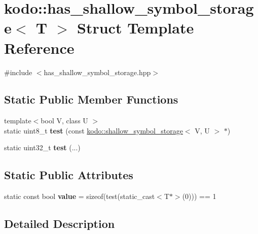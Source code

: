 \hypertarget{structkodo_1_1has__shallow__symbol__storage}{\section{kodo\-:\-:has\-\_\-shallow\-\_\-symbol\-\_\-storage$<$ T $>$ Struct Template Reference}
\label{structkodo_1_1has__shallow__symbol__storage}
}


{\ttfamily \#include $<$has\-\_\-shallow\-\_\-symbol\-\_\-storage.\-hpp$>$}

\subsection*{Static Public Member Functions}
\begin{DoxyCompactItemize}
\item 
\hypertarget{structkodo_1_1has__shallow__symbol__storage_a24e5e307cd379e92d25d6f07db5ea3c7}{{\footnotesize template$<$bool V, class U $>$ }\\static uint8\-\_\-t {\bfseries test} (const \hyperlink{classkodo_1_1shallow__symbol__storage}{kodo\-::shallow\-\_\-symbol\-\_\-storage}$<$ V, U $>$ $\ast$)}\label{structkodo_1_1has__shallow__symbol__storage_a24e5e307cd379e92d25d6f07db5ea3c7}

\item 
\hypertarget{structkodo_1_1has__shallow__symbol__storage_a10e5fda275bf02acf918cb5fc608423d}{static uint32\-\_\-t {\bfseries test} (...)}\label{structkodo_1_1has__shallow__symbol__storage_a10e5fda275bf02acf918cb5fc608423d}

\end{DoxyCompactItemize}
\subsection*{Static Public Attributes}
\begin{DoxyCompactItemize}
\item 
\hypertarget{structkodo_1_1has__shallow__symbol__storage_a527dbfe7bc11a988e6db04e9d0dca62c}{static const bool {\bfseries value} = sizeof(test(static\-\_\-cast$<$T$\ast$$>$(0))) == 1}\label{structkodo_1_1has__shallow__symbol__storage_a527dbfe7bc11a988e6db04e9d0dca62c}

\end{DoxyCompactItemize}


\subsection{Detailed Description}
